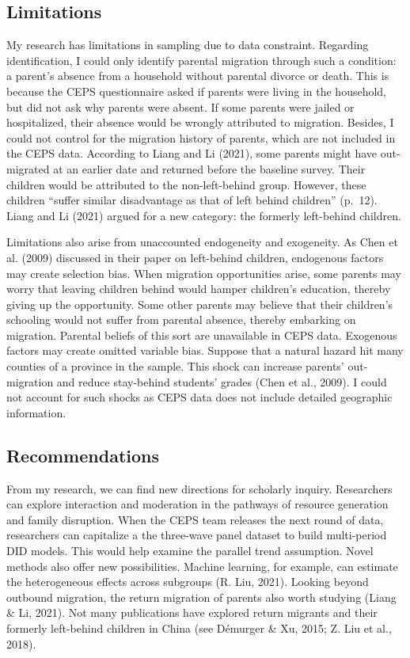 \documentclass[
  man,floatsintext]{apa7}
\begin{document}
\hypertarget{limitations}{%
\subsection{Limitations}\label{limitations}}

My research has limitations in sampling due to data constraint. Regarding identification, I could only identify parental migration through such a condition: a parent's absence from a household without parental divorce or death. This is because the CEPS questionnaire asked if parents were living in the household, but did not ask why parents were absent. If some parents were jailed or hospitalized, their absence would be wrongly attributed to migration. Besides, I could not control for the migration history of parents, which are not included in the CEPS data. According to Liang and Li (2021), some parents might have out-migrated at an earlier date and returned before the baseline survey. Their children would be attributed to the non-left-behind group. However, these children ``suffer similar disadvantage as that of left behind children'' (p.~12). Liang and Li (2021) argued for a new category: the formerly left-behind children.

Limitations also arise from unaccounted endogeneity and exogeneity. As Chen et al. (2009) discussed in their paper on left-behind children, endogenous factors may create selection bias. When migration opportunities arise, some parents may worry that leaving children behind would hamper children's education, thereby giving up the opportunity. Some other parents may believe that their children's schooling would not suffer from parental absence, thereby embarking on migration. Parental beliefs of this sort are unavailable in CEPS data. Exogenous factors may create omitted variable bias. Suppose that a natural hazard hit many counties of a province in the sample. This shock can increase parents' out-migration and reduce stay-behind students' grades (Chen et al., 2009). I could not account for such shocks as CEPS data does not include detailed geographic information.

\hypertarget{recommendations}{%
\subsection{Recommendations}\label{recommendations}}

From my research, we can find new directions for scholarly inquiry. Researchers can explore interaction and moderation in the pathways of resource generation and family disruption. When the CEPS team releases the next round of data, researchers can capitalize a the three-wave panel dataset to build multi-period DID models. This would help examine the parallel trend assumption. Novel methods also offer new possibilities. Machine learning, for example, can estimate the heterogeneous effects across subgroups (R. Liu, 2021). Looking beyond outbound migration, the return migration of parents also worth studying (Liang \& Li, 2021). Not many publications have explored return migrants and their formerly left-behind children in China (see Démurger \& Xu, 2015; Z. Liu et al., 2018).
\end{document}
